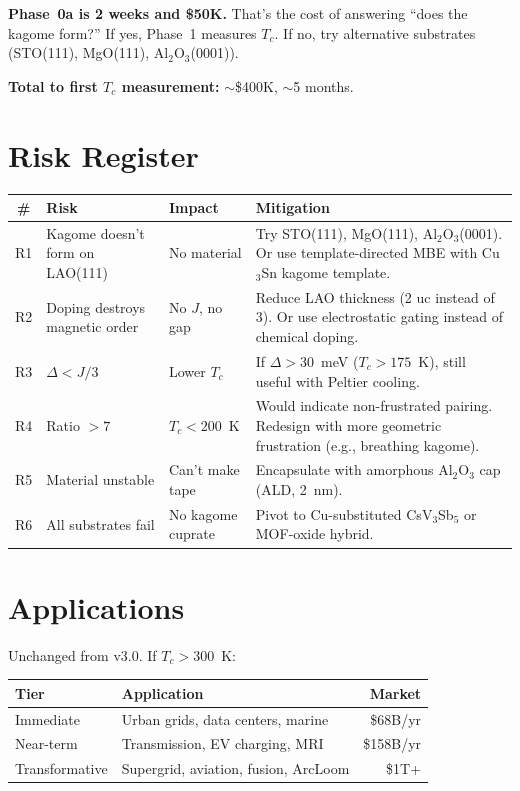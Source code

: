 \documentclass[11pt, a4paper]{article}
\begin{document}
\textbf{Phase~0a is 2 weeks and \$50K.} That's the cost of
answering ``does the kagome form?'' If yes, Phase~1 measures $T_c$.
If no, try alternative substrates (STO(111), MgO(111), Al$_2$O$_3$(0001)).

\textbf{Total to first $T_c$ measurement:} $\sim$\$400K, $\sim$5 months.

\section{Risk Register}

\begin{center}
\begin{tabular}{@{}cp{2.2cm}p{2.2cm}p{5cm}@{}}
\toprule
\textbf{\#} & \textbf{Risk} & \textbf{Impact} & \textbf{Mitigation} \\
\midrule
R1 & Kagome doesn't form on LAO(111) & No material &
  Try STO(111), MgO(111), Al$_2$O$_3$(0001). Or use
  template-directed MBE with Cu$_3$Sn kagome template. \\
R2 & Doping destroys magnetic order & No $J$, no gap &
  Reduce LAO thickness (2 uc instead of 3). Or use
  electrostatic gating instead of chemical doping. \\
R3 & $\Delta < J/3$ & Lower $T_c$ & If $\Delta > 30$~meV
  ($T_c > 175$~K), still useful with Peltier cooling. \\
R4 & Ratio $> 7$ & $T_c < 200$~K & Would indicate
  non-frustrated pairing. Redesign with more geometric
  frustration (e.g., breathing kagome). \\
R5 & Material unstable & Can't make tape & Encapsulate
  with amorphous Al$_2$O$_3$ cap (ALD, 2~nm). \\
R6 & All substrates fail & No kagome cuprate & Pivot to
  Cu-substituted CsV$_3$Sb$_5$ or MOF-oxide hybrid. \\
\bottomrule
\end{tabular}
\end{center}

\section{Applications}

Unchanged from v3.0. If $T_c > 300$~K:

\begin{center}
\begin{tabular}{@{}llr@{}}
\toprule
\textbf{Tier} & \textbf{Application} & \textbf{Market} \\
\midrule
Immediate & Urban grids, data centers, marine & \$68B/yr \\
Near-term & Transmission, EV charging, MRI & \$158B/yr \\
Transformative & Supergrid, aviation, fusion, ArcLoom & \$1T+ \\
\bottomrule
\end{tabular}
\end{center}
\end{document}
